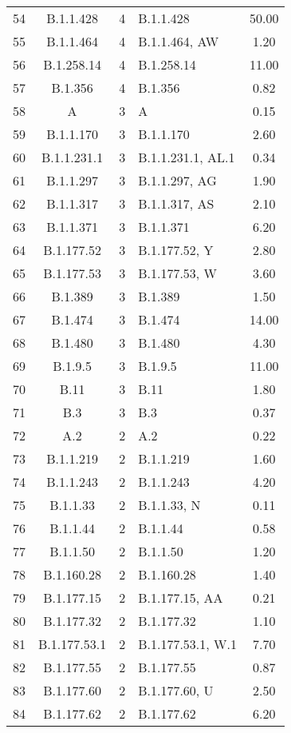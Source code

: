 \begin{longtable}{cccP{4cm}c}
  54 & B.1.1.428 &   4 & B.1.1.428 & 50.00 \\ 
  55 & B.1.1.464 &   4 & B.1.1.464, AW & 1.20 \\ 
  56 & B.1.258.14 &   4 & B.1.258.14 & 11.00 \\ 
  57 & B.1.356 &   4 & B.1.356 & 0.82 \\ 
  58 & A &   3 & A & 0.15 \\ 
  59 & B.1.1.170 &   3 & B.1.1.170 & 2.60 \\ 
  60 & B.1.1.231.1 &   3 & B.1.1.231.1, AL.1 & 0.34 \\ 
  61 & B.1.1.297 &   3 & B.1.1.297, AG & 1.90 \\ 
  62 & B.1.1.317 &   3 & B.1.1.317, AS & 2.10 \\ 
  63 & B.1.1.371 &   3 & B.1.1.371 & 6.20 \\ 
  64 & B.1.177.52 &   3 & B.1.177.52, Y & 2.80 \\ 
  65 & B.1.177.53 &   3 & B.1.177.53, W & 3.60 \\ 
  66 & B.1.389 &   3 & B.1.389 & 1.50 \\ 
  67 & B.1.474 &   3 & B.1.474 & 14.00 \\ 
  68 & B.1.480 &   3 & B.1.480 & 4.30 \\ 
  69 & B.1.9.5 &   3 & B.1.9.5 & 11.00 \\ 
  70 & B.11 &   3 & B.11 & 1.80 \\ 
  71 & B.3 &   3 & B.3 & 0.37 \\ 
  72 & A.2 &   2 & A.2 & 0.22 \\ 
  73 & B.1.1.219 &   2 & B.1.1.219 & 1.60 \\ 
  74 & B.1.1.243 &   2 & B.1.1.243 & 4.20 \\ 
  75 & B.1.1.33 &   2 & B.1.1.33, N & 0.11 \\ 
  76 & B.1.1.44 &   2 & B.1.1.44 & 0.58 \\ 
  77 & B.1.1.50 &   2 & B.1.1.50 & 1.20 \\ 
  78 & B.1.160.28 &   2 & B.1.160.28 & 1.40 \\ 
  79 & B.1.177.15 &   2 & B.1.177.15, AA & 0.21 \\ 
  80 & B.1.177.32 &   2 & B.1.177.32 & 1.10 \\ 
  81 & B.1.177.53.1 &   2 & B.1.177.53.1, W.1 & 7.70 \\ 
  82 & B.1.177.55 &   2 & B.1.177.55 & 0.87 \\ 
  83 & B.1.177.60 &   2 & B.1.177.60, U & 2.50 \\ 
  84 & B.1.177.62 &   2 & B.1.177.62 & 6.20 \\ 

\end{longtable}
